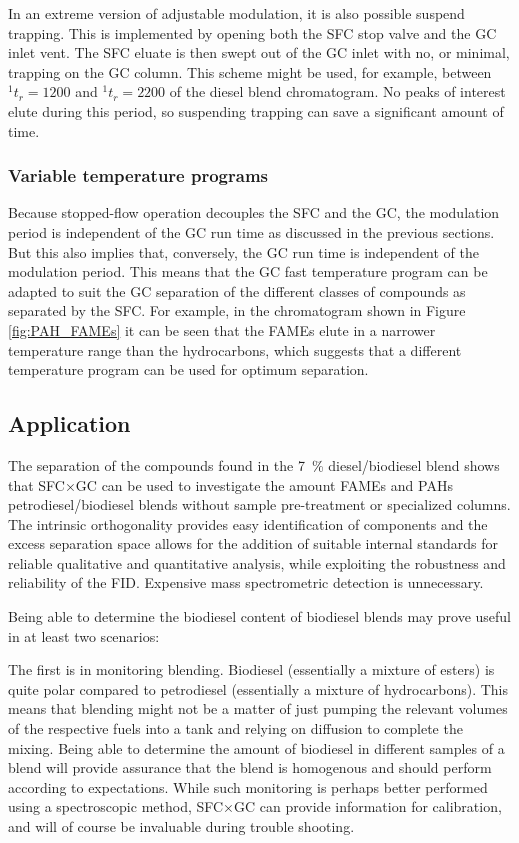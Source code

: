 In an extreme version of adjustable modulation, it is also possible  suspend
trapping. This is implemented by opening both the SFC stop valve and the GC
inlet vent. The SFC eluate is then swept out of the GC inlet with no, or
minimal, trapping on the GC column. This scheme might be used, for example,
between \(^{1}t_r = 1200\) and \(^{1}t_r = 2200\) of the diesel blend
chromatogram. No peaks of interest elute during this period, so suspending
trapping can save a significant amount of time.

\subsubsection{Variable temperature programs}

Because stopped-flow operation decouples the SFC and the GC, the modulation
period is independent of the GC run time as discussed in the previous sections.
But this also implies that, conversely,  the GC run time is independent of the
modulation period. This means that the GC fast temperature program can be
adapted to suit the GC separation of the different classes of compounds as
separated by the SFC. For example, in the chromatogram shown in Figure
\ref{fig:PAH_FAMEs} it can be seen that the FAMEs elute in a narrower
temperature range than the hydrocarbons, which suggests that a different
temperature program can be used for optimum separation.

\subsection{Application}

The separation of the compounds found in the \SI{7}{\percent} diesel/biodiesel
blend shows that SFC×GC can be used to investigate the amount FAMEs and PAHs
petrodiesel/biodiesel blends without sample pre-treatment or specialized
columns. The intrinsic orthogonality provides easy identification of components
and the excess separation space allows for the addition of suitable internal
standards for reliable qualitative and quantitative analysis, while exploiting
the robustness and reliability of the FID. Expensive mass spectrometric
detection is unnecessary.

Being able to determine the biodiesel content of biodiesel blends may prove
useful in at least two scenarios: 

The first is in monitoring blending. Biodiesel (essentially a mixture of esters)
is quite polar compared to petrodiesel (essentially a mixture of hydrocarbons).
This means that blending might not be a matter of just pumping the relevant
volumes of the respective fuels into a tank and relying on diffusion to complete
the mixing. Being able to determine the amount of biodiesel in different samples
of a blend will provide assurance that the blend is homogenous and should
perform according to expectations. While such monitoring is perhaps better
performed using a spectroscopic method, SFC×GC can provide information for
calibration, and will of course be invaluable during trouble shooting.

